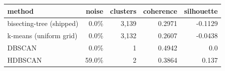 \begin{tabular}{lrrrr}
\toprule
method & noise & clusters & coherence & silhouette \\
\midrule
bisecting-tree (shipped) & 0.0\% & 3,139 & 0.2971 & -0.1129 \\
k-means (uniform grid) & 0.0\% & 3,132 & 0.2607 & -0.0438 \\
DBSCAN & 0.0\% & 1 & 0.4942 & 0.0 \\
HDBSCAN & 59.0\% & 2 & 0.3864 & 0.137 \\
\bottomrule
\end{tabular}
